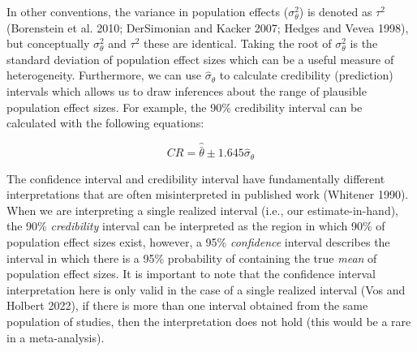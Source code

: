\documentclass[
  letterpaper,
  DIV=11,
  numbers=noendperiod]{scrreprt}
\begin{document}
In other conventions, the variance in population effects
(\(\sigma^2_\theta\)) is denoted as \(\tau^2\) (Borenstein et al. 2010;
DerSimonian and Kacker 2007; Hedges and Vevea 1998), but conceptually
\(\sigma^2_\theta\) and \(\tau^2\) these are identical. Taking the root
of \(\sigma^2_\theta\) is the standard deviation of population effect
sizes which can be a useful measure of heterogeneity. Furthermore, we
can use \(\hat{\sigma}_\theta\) to calculate credibility (prediction)
intervals which allows us to draw inferences about the range of
plausible population effect sizes. For example, the 90\% credibility
interval can be calculated with the following equations:

\[
CR = \hat{\bar{\theta}} \pm 1.645\hat{\sigma}_\theta
\]

The confidence interval and credibility interval have fundamentally
different interpretations that are often misinterpreted in published
work (Whitener 1990). When we are interpreting a single realized
interval (i.e., our estimate-in-hand), the 90\% \emph{credibility}
interval can be interpreted as the region in which 90\% of population
effect sizes exist, however, a 95\% \emph{confidence} interval describes
the interval in which there is a 95\% probability of containing the true
\emph{mean} of population effect sizes. It is important to note that the
confidence interval interpretation here is only valid in the case of a
single realized interval (Vos and Holbert 2022), if there is more than
one interval obtained from the same population of studies, then the
interpretation does not hold (this would be a rare in a meta-analysis).
\end{document}
